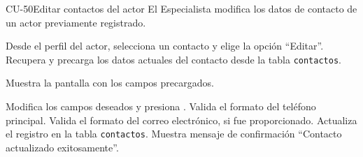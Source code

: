 \begin{UseCase}{CU-50}{Editar contactos del actor}{
		El Especialista modifica los datos de contacto de un actor previamente registrado.
	}
{\begin{Titemize}
		\end{Titemize}
	}
\end{UseCase}
\begin{UCtrayectoria}
	\UCpaso[\UCactor] Desde el perfil del actor, selecciona un contacto y elige la opción ``Editar''.
	\UCpaso Recupera y precarga los datos actuales del contacto desde la tabla \texttt{contactos}.
	
	\UCpaso Muestra la pantalla  con los campos precargados.
	
	
	\UCpaso[\UCactor] \label{CU-50.modificaContacto} Modifica los campos deseados y presiona .
	\UCpaso Valida el formato del teléfono principal. 
	\UCpaso Valida el formato del correo electrónico, si fue proporcionado. 
	\UCpaso Actualiza el registro en la tabla \texttt{contactos}.
	\UCpaso Muestra mensaje de confirmación ``Contacto actualizado exitosamente''.
\end{UCtrayectoria}

